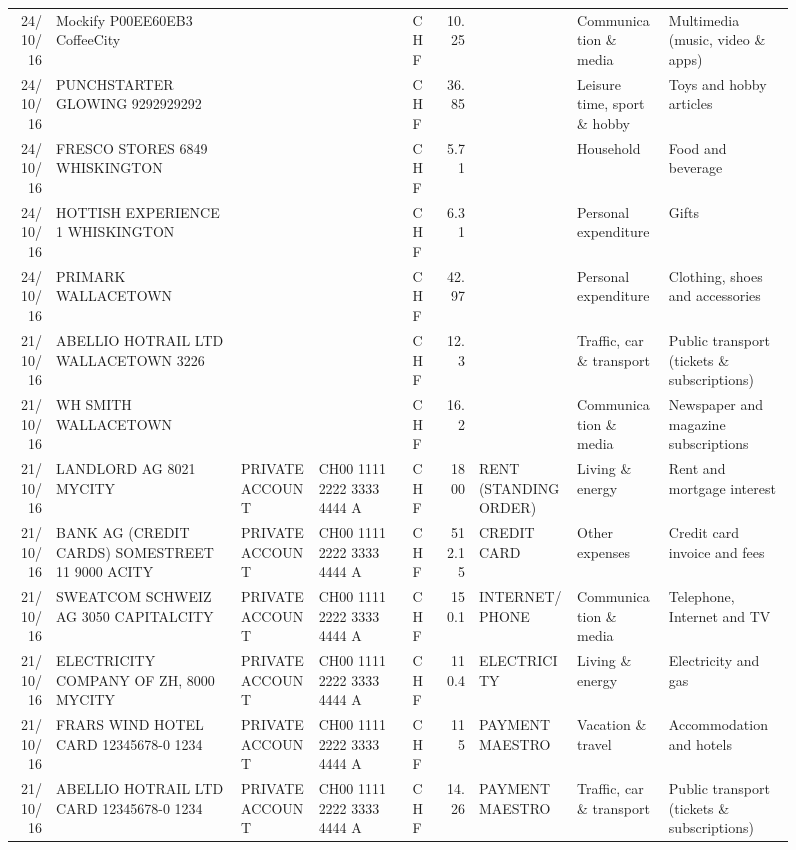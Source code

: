 \begin{landscape}
\begin{sidewaysfigure}
\begin{table}[h]
\begin{center}
\begin{tabular}{rllllrlll}
		24/10/16 & Mockify P00EE60EB3       CoffeeCity &       &       & CHF   & 10.25 &       & Communication \& media & Multimedia (music, video \& apps) \\
		24/10/16 & PUNCHSTARTER GLOWING   9292929292 &       &       & CHF   & 36.85 &       & Leisure time, sport \& hobby & Toys and hobby articles \\
		24/10/16 & FRESCO STORES 6849        WHISKINGTON &       &       & CHF   & 5.71  &       & Household & Food and beverage \\
		24/10/16 & HOTTISH EXPERIENCE 1    WHISKINGTON &       &       & CHF   & 6.31  &       & Personal expenditure & Gifts \\
		24/10/16 & PRIMARK                  WALLACETOWN &       &       & CHF   & 42.97 &       & Personal expenditure & Clothing, shoes and accessories \\
		21/10/16 & ABELLIO HOTRAIL LTD     WALLACETOWN 3226 &       &       & CHF   & 12.3  &       & Traffic, car \& transport & Public transport (tickets \& subscriptions) \\
		21/10/16 & WH SMITH                 WALLACETOWN &       &       & CHF   & 16.2  &       & Communication \& media & Newspaper and magazine subscriptions \\
		21/10/16 & LANDLORD AG 8021 MYCITY & PRIVATE ACCOUNT & CH00 1111 2222 3333 4444 A & CHF   & 1800  & RENT (STANDING ORDER) & Living \& energy & Rent and mortgage interest \\
		21/10/16 & BANK AG (CREDIT CARDS) SOMESTREET 11 9000 ACITY & PRIVATE ACCOUNT & CH00 1111 2222 3333 4444 A & CHF   & 512.15 & CREDIT CARD & Other expenses & Credit card invoice and fees \\
		21/10/16 & SWEATCOM SCHWEIZ AG 3050 CAPITALCITY & PRIVATE ACCOUNT & CH00 1111 2222 3333 4444 A & CHF   & 150.1 & INTERNET/PHONE & Communication \& media & Telephone,  Internet and TV \\
		21/10/16 & ELECTRICITY COMPANY OF ZH, 8000 MYCITY & PRIVATE ACCOUNT & CH00 1111 2222 3333 4444 A & CHF   & 110.4 & ELECTRICITY & Living \& energy & Electricity and gas \\
		21/10/16 & FRARS WIND HOTEL CARD 12345678-0 1234 & PRIVATE ACCOUNT & CH00 1111 2222 3333 4444 A & CHF   & 115   & PAYMENT MAESTRO & Vacation \& travel & Accommodation and hotels \\
		21/10/16 & ABELLIO HOTRAIL LTD CARD 12345678-0 1234 & PRIVATE ACCOUNT & CH00 1111 2222 3333 4444 A & CHF   & 14.26 & PAYMENT MAESTRO & Traffic, car \& transport & Public transport (tickets \& subscriptions) \\

\end{tabular}
\end{center}
\end{table}
\end{sidewaysfigure}
\end{landscape}
